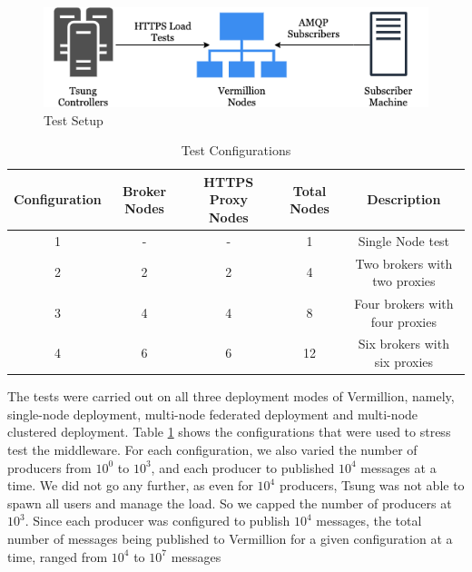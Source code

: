 \documentclass[conference, 10pt]{IEEEtran}
\begin{document}
\begin{figure}
\includegraphics[width=\linewidth, height=\linewidth, keepaspectratio]{TestSetup.png}
\caption{Test Setup}
\label{testsetup}
\end{figure}

\begin{table}
\centering
\begin{tabular}{||c c c c c||} 
 \hline
 Configuration & Broker Nodes &  HTTPS Proxy Nodes & Total Nodes & Description\\ [0.5ex] 
 \hline\hline
 1 & - & - & 1 & Single Node test \\
 \hline 
 2 & 2 & 2 & 4 & Two brokers with two proxies \\
 \hline
 3 & 4 & 4 & 8 & Four brokers with four proxies\\
 \hline
 4 & 6 & 6 & 12 & Six brokers with six proxies \\
 \hline
\end{tabular}
\vspace{1em}
\caption{Test Configurations}
\label{configurations}
\end{table}

The tests were carried out on all three deployment modes of Vermillion, namely, single-node deployment, multi-node federated deployment and multi-node clustered deployment. Table \ref{configurations} shows the configurations that were used to stress test the middleware. For each configuration, we also varied the number of producers from  $10^0$ to $10^3$, and each producer to published $10^4$ messages at a time. We did not go any further, as even for $10^4$ producers, Tsung was not able to spawn all users and manage the load. So we capped the number of producers at $10^3$. Since each producer was configured to publish $10^4$ messages, the total number of messages being published to Vermillion for a given configuration at a time, ranged from $10^4$ to $10^7$  messages\\
\end{document}
